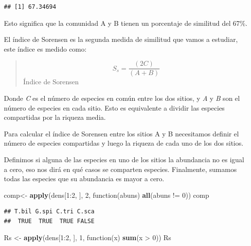 \documentclass[]{book}
\newenvironment{Shaded}{\begin{snugshade}}{\end{snugshade}}
\newcommand{\KeywordTok}[1]{\textcolor[rgb]{0.13,0.29,0.53}{\textbf{{#1}}}}
\newcommand{\DecValTok}[1]{\textcolor[rgb]{0.00,0.00,0.81}{{#1}}}
\newcommand{\StringTok}[1]{\textcolor[rgb]{0.31,0.60,0.02}{{#1}}}
\newcommand{\NormalTok}[1]{{#1}}
\begin{document}
\begin{verbatim}
## [1] 67.34694
\end{verbatim}

Esto significa que la comunidad A y B tienen un porcentaje de similitud
del 67\%.

El índice de Sorensen es la segunda medida de similitud que vamos a
estudiar, este índice es medido como:

\begin{quote}
\[S_s= \frac{(2C)}{(A+B)}\] Índice de Sorensen
\end{quote}

Donde \emph{C} es el número de especies en común entre los dos sitios, y
\emph{A} y \emph{B} son el número de especies en cada sitio. Esto es
equivalente a dividir las especies compartidas por la riqueza media.

Para calcular el índice de Sorensen entre los sitios A y B necesitamos
definir el número de especies compartidas y luego la riqueza de cada uno
de los dos sitios.

Definimos si alguna de las especies en uno de los sitios la abundancia
no es igual a cero, eso nos dirá en qué casos se comparten especies.
Finalmente, sumamos todas las especies que su abundancia es mayor a
cero.

\begin{Shaded}
\begin{Highlighting}[]
\NormalTok{comp<-}\StringTok{ }\KeywordTok{apply}\NormalTok{(dens[}\DecValTok{1}\NormalTok{:}\DecValTok{2}\NormalTok{, ], }\DecValTok{2}\NormalTok{, function(abuns) }\KeywordTok{all}\NormalTok{(abuns !=}\StringTok{ }\DecValTok{0}\NormalTok{))}
\NormalTok{comp}
\end{Highlighting}
\end{Shaded}

\begin{verbatim}
## T.bil G.spi C.tri C.sca 
##  TRUE  TRUE  TRUE FALSE
\end{verbatim}

\begin{Shaded}
\begin{Highlighting}[]
\NormalTok{Rs <-}\StringTok{ }\KeywordTok{apply}\NormalTok{(dens[}\DecValTok{1}\NormalTok{:}\DecValTok{2}\NormalTok{, ], }\DecValTok{1}\NormalTok{, function(x) }\KeywordTok{sum}\NormalTok{(x >}\StringTok{ }\DecValTok{0}\NormalTok{))}
\NormalTok{Rs}
\end{Highlighting}
\end{Shaded}
\end{document}
